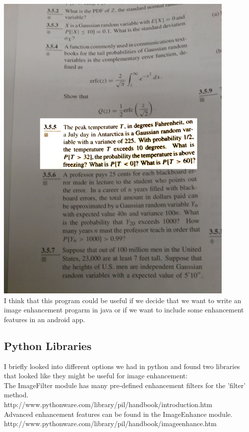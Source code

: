 \documentclass[]{article}
\begin{document}
		\includegraphics{images/ImageClarityWithImageJ.jpg} \\
		
		I think that this program could be useful if we decide that we want to write an image enhancement progarm in java or if we want to include some enhancement features in an android app. \\
		
		\subsection{Python Libraries}
		
		I briefly looked into different options we had in python and found two libraries that looked like they might be useful for image enhancement: \\
		
		The ImageFilter module has many pre-defined enhancement filters for the 'filter' method. \\
		http://www.pythonware.com/library/pil/handbook/introduction.htm\\
		
		Advanced enhancement features can be found in the ImageEnhance module. \\
		http://www.pythonware.com/library/pil/handbook/imageenhance.htm \\
	
\end{document}
